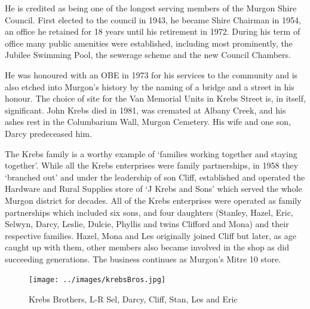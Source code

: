 He is credited as being one of the longest serving members of the Murgon Shire Council. First elected to the council in 1943, he became Shire Chairman in 1954, an office he retained for 18 years until his retirement in 1972. During his term of office many public amenities were established, including most prominently, the Jubilee Swimming Pool, the sewerage scheme and the new Council Chambers.



He was honoured with an OBE in 1973 for his services to the community and is also etched into Murgon's history by the naming of a bridge and a street in his honour. The choice of site for the Van Memorial Units in Krebs Street is, in itself, significant. John Krebs died in 1981, was cremated at Albany Creek, and his ashes rest in the Columbarium Wall, Murgon Cemetery. His wife and one son, Darcy predeceased him.



The Krebs family is a worthy example of `families working together and staying together'. While all the Krebs enterprises were family partnerships, in 1958 they `branched out' and under the leadership of son Cliff, established and operated the Hardware and Rural Supplies store of `J Krebs and Sons' which served the whole Murgon district for decades. All of the Krebs enterprises were operated as family partnerships which included six sons, and four daughters (Stanley, Hazel, Eric, Selwyn, Darcy, Leslie, Dulcie, Phyllis and twins Clifford and Mona) and their respective families. Hazel, Mona and Les originally joined Cliff but later, as age caught up with them, other members also became involved in the shop as did succeeding generations. The business continues as Murgon's Mitre 10 store.









\begin{figure}
\begin{center}
\texttt{[image: ../images/krebsBros.jpg]}
\caption{Krebs Brothers, L-R Sel, Darcy, Cliff, Stan, Les and Eric}
\end{center}
\end{figure}




